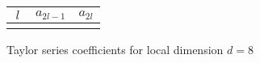 \documentclass[11pt, oneside]{article}
\begin{document}
\newcommand{\dval}{8}    %
\newcommand{\ORDval}{32} %

\begin{center}
\renewcommand{\arraystretch}{1.2}
\begin{tabular}{|c|| c| c |} 
 \hline
  $\ l \ $ & $a_{2l-1}$ & $a_{2l}$  \\ [0.5ex] 
 \hline
%
\\[0.3ex]
 \hline
\end{tabular}

\bigskip

Taylor series coefficients for local dimension $d = \dval$
\end{center}
\end{document}
